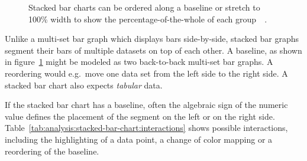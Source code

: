 \begin{figure}
  \centering
  \qquad
  \caption{Stacked bar charts can be ordered along a baseline or stretch to 100\% width to show the percentage-of-the-whole of each group~\parencite{Mann2017}~\parencite{Peltier2017}.}%
  \label{fig:analysis:stacked-bar-chart}
\end{figure}

Unlike a multi-set bar graph which displays bars side-by-side, stacked bar graphs segment their bars of multiple datasets on top of each other.
A baseline, as shown in figure~\ref{fig:analysis:stacked-bar-chart} might be modeled as two back-to-back multi-set bar graphs. A reordering would e.g.\ move one data set from the left side to the right side.
A stacked bar chart also expects \emph{tabular} data.

If the stacked bar chart has a baseline, often the algebraic sign of the numeric value defines the placement of the segment on the left or on the right side.
Table~\ref{tab:analysis:stacked-bar-chart:interactions} shows possible interactions, including the highlighting of a data point, a change of color mapping or a reordering of the baseline.

